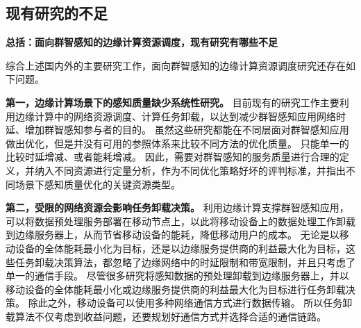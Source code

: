 

\subsection{现有研究的不足}
\textbf{总括：面向群智感知的边缘计算资源调度，现有研究有哪些不足}

综合上述国内外的主要研究工作，面向群智感知的边缘计算资源调度研究还存在如下问题。

\textbf{第一，边缘计算场景下的感知质量缺少系统性研究。}
目前现有的研究工作主要利用边缘计算中的网络资源调度、计算任务卸载，以达到减少群智感知应用网络时延、增加群智感知参与者的目的。
虽然这些研究都能在不同层面对群智感知应用做出优化，但是并没有可用的参照体系来比较不同方法的优化质量。
只能单一的比较时延增减、或者能耗增减。
因此，需要对群智感知的服务质量进行合理的定义，并纳入不同资源进行定量分析，作为不同优化策略好坏的评判标准，并指出不同场景下感知质量优化的关键资源类型。

\textbf{第二，受限的网络资源会影响任务卸载决策。}
利用边缘计算支撑群智感知应用，可以将数据预处理服务部署在移动节点上，以此将移动设备上的数据处理工作卸载到边缘服务器上，从而节省移动设备的能耗，降低移动用户的成本。
无论是以移动设备的全体能耗最小化为目标，还是以边缘服务提供商的利益最大化为目标，这些任务卸载决策算法，都忽略了边缘网络中的时延限制和带宽限制，并且只考虑了单一的通信手段。
尽管很多研究将感知数据的预处理卸载到边缘服务器上，并以移动设备的全体能耗最小化或边缘服务提供商的利益最大化为目标进行任务卸载决策。
除此之外，移动设备可以使用多种网络通信方式进行数据传输。
所以任务卸载算法不仅考虑到收益问题，还要规划好通信方式并选择合适的通信链路。


